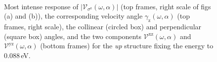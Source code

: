 \documentclass[prb,11pt,tightenlines,twocolumn,aps]{revtex4-1}
\begin{document}
\begin{figure}[t]
    \centering
    \\

    \caption{Most intense response of
    $|\mathcal{V}_{\sigma^{\mathrm{z}}}(\omega,\alpha)|$ (top frames, right
    scale of figs (a) and (b)), the corresponding velocity angle
    $\gamma_{\mathrm{z}}(\omega,\alpha)$ (top frames, right scale), the
    collinear (circled box) and perpendicular (square box) angles, and the two
    components $\mathcal{V}^{\mathrm{xz}}(\omega,\alpha)$ and
    $\mathcal{V}^{\mathrm{yz}}(\omega,\alpha)$ (bottom frames) for the \emph{up}
    structure fixing the energy to 0.088\,eV. }
    \label{fig:up-vaz-rag}
\end{figure}
\end{document}
